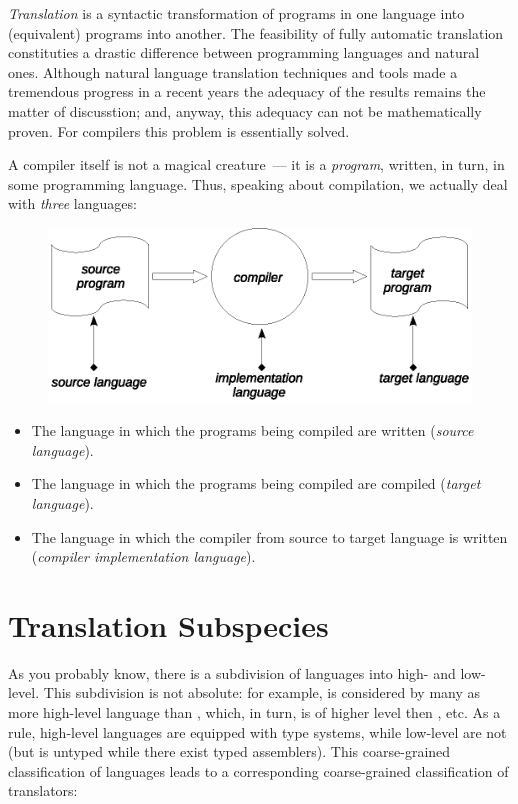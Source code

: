 \emph{Translation} is a syntactic transformation of programs in one language into (equivalent) programs into another.
The feasibility of fully automatic translation constituties a drastic difference between programming languages and natural ones.
Although natural language translation techniques and tools made a tremendous progress in a recent years the adequacy of the results
remains the matter of discusstion; and, anyway, this adequacy can not be mathematically proven. For compilers this problem
is essentially solved.

A compiler itself is not a magical creature~--- it is a \emph{program}, written, in turn, in some programming language. Thus, speaking
about compilation, we actually deal with \emph{three} languages:

\begin{figure}[h]
  \centering
  \includegraphics[scale=0.7]{images/01-04.eps}
\end{figure}

\begin{itemize}
\item The language in which the programs being compiled are written (\emph{source language}).
\item The language in which the programs being compiled are compiled (\emph{target language}).
\item The language in which the compiler from source to target language is written (\emph{compiler implementation language}).
\end{itemize}

\section{Translation Subspecies}

As you probably know, there is a subdivision of languages into high- and low-level. This subdivision is not absolute: for example,
 is considered by many as more high-level language than , which, in turn, is of higher level then , etc.
As a rule, high-level languages are equipped with type systems, while low-level are not (but  is untyped while there 
exist typed assemblers). This coarse-grained classification of languages leads to a corresponding coarse-grained classification of
translators:


